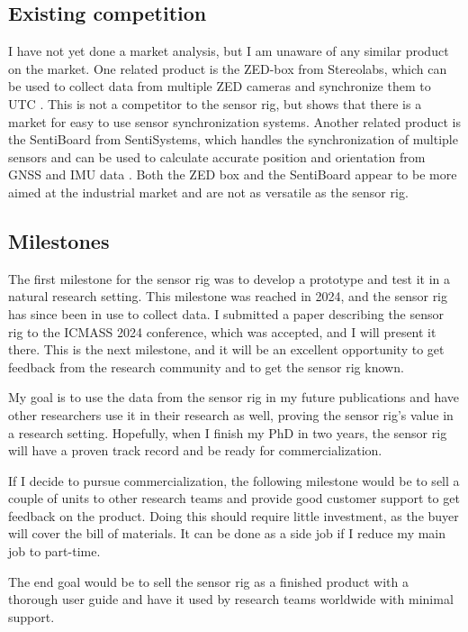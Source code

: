 \documentclass{iopconfser}
\begin{document}
\subsection*{Existing competition}
I have not yet done a market analysis, but I am unaware of any similar product on the market.
One related product is the ZED-box from Stereolabs, which can be used to collect data from multiple ZED cameras and synchronize them to UTC \cite{stereolabsZEDBoxEmbedded}. 
This is not a competitor to the sensor rig, but shows that there is a market for easy to use sensor synchronization systems.
Another related product is the SentiBoard from SentiSystems, which handles the synchronization of multiple sensors and can be used to calculate accurate position and orientation from GNSS and IMU data \cite{sentisystemsSentiSystemsSolutions}.
Both the ZED box and the SentiBoard appear to be more aimed at the industrial market and are not as versatile as the sensor rig.

\subsection*{Milestones}
The first milestone for the sensor rig was to develop a prototype and test it in a natural research setting.
This milestone was reached in 2024, and the sensor rig has since been in use to collect data.
I submitted a paper describing the sensor rig to the ICMASS 2024 conference, which was accepted, and I will present it there.
This is the next milestone, and it will be an excellent opportunity to get feedback from the research community and to get the sensor rig known.

My goal is to use the data from the sensor rig in my future publications and have other researchers use it in their research as well, proving the sensor rig's value in a research setting.
Hopefully, when I finish my PhD in two years, the sensor rig will have a proven track record and be ready for commercialization.

If I decide to pursue commercialization, the following milestone would be to sell a couple of units to other research teams and provide good customer support to get feedback on the product.
Doing this should require little investment, as the buyer will cover the bill of materials. It can be done as a side job if I reduce my main job to part-time.

The end goal would be to sell the sensor rig as a finished product with a thorough user guide and have it used by research teams worldwide with minimal support.
\end{document}
